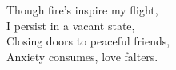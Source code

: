 Though fire's inspire my flight, \\
I persist in a vacant state, \\
Closing doors to peaceful friends, \\
Anxiety consumes, love falters. \\

